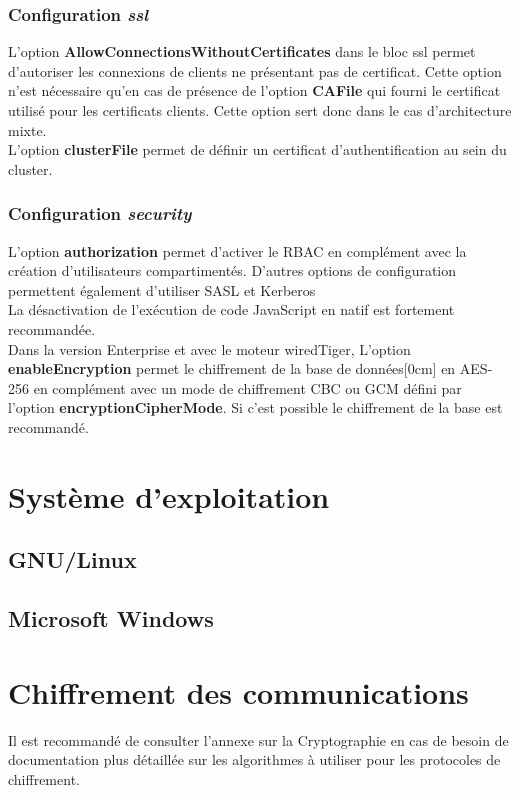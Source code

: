 \documentclass[twoside,a4paper,12pt,titlepage]{book}
\newcommand{\MarginPar}[2]{\marginnote{\scriptsize #1}[#2]}
\begin{document}
\subsubsection{Configuration \textit{ssl}}
L'option \textbf{AllowConnectionsWithoutCertificates} dans le bloc ssl permet d'autoriser les connexions de clients ne présentant pas de certificat. Cette option n'est nécessaire qu'en cas de présence de l'option \textbf{CAFile} qui fourni le certificat utilisé pour les certificats clients. Cette option sert donc dans le cas d'architecture mixte.\\
L'option \textbf{clusterFile} permet de définir un certificat d'authentification au sein du cluster.

\subsubsection{Configuration \textit{security}}
L'option \textbf{authorization} permet d'activer le \gls{RBAC} en complément avec la création d'utilisateurs compartimentés. D'autres options de configuration permettent également d'utiliser SASL et Kerberos\\
La désactivation de l'exécution de code JavaScript en natif est fortement recommandée.\\ 
Dans la version Enterprise et avec le moteur wiredTiger, L'option \textbf{enableEncryption} permet le chiffrement de la base de données\MarginPar{\textbf{Chiffrement en base de données}}{0cm} en AES-256 en complément avec un mode de chiffrement \gls{CBC} ou \gls{GCM} défini par l'option \textbf{encryptionCipherMode}. Si c'est possible le chiffrement de la base est recommandé.

\section{Système d'exploitation}
\subsection{GNU/Linux}
\subsection{Microsoft Windows}


\section{Chiffrement des communications}
\begin{Warning}
Il est recommandé de consulter l'annexe sur la Cryptographie en cas de besoin de documentation plus détaillée sur les algorithmes à utiliser pour les protocoles de chiffrement.
\end{Warning}
\end{document}
